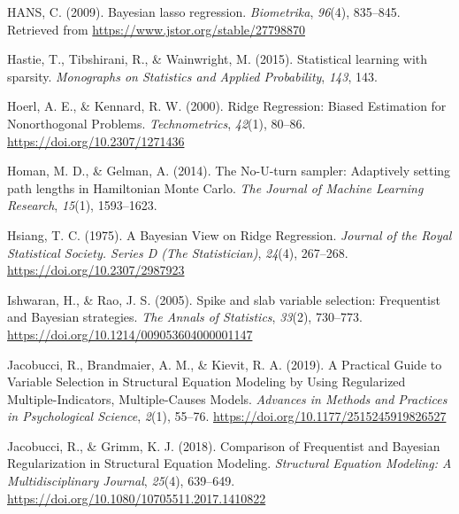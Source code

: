 \documentclass[
  man, donotrepeattitle,floatsintext]{apa6}
\newlength{\cslhangindent}
\newlength{\cslentryspacingunit} %
\newenvironment{CSLReferences}[2] %
 {%
  \setlength{\parindent}{0pt}
  \ifodd #1
  \let\oldpar\par
  \def\par{\hangindent=\cslhangindent\oldpar}
  \fi
  \setlength{\parskip}{#2\cslentryspacingunit}
 }%
 {}
\begin{document}
\begin{CSLReferences}{1}{0}
\leavevmode{}%
HANS, C. (2009). Bayesian lasso regression. \emph{Biometrika}, \emph{96}(4), 835--845. Retrieved from \url{https://www.jstor.org/stable/27798870}

\leavevmode{}%
Hastie, T., Tibshirani, R., \& Wainwright, M. (2015). Statistical learning with sparsity. \emph{Monographs on Statistics and Applied Probability}, \emph{143}, 143.

\leavevmode{}%
Hoerl, A. E., \& Kennard, R. W. (2000). Ridge {Regression}: {Biased} {Estimation} for {Nonorthogonal} {Problems}. \emph{Technometrics}, \emph{42}(1), 80--86. \url{https://doi.org/10.2307/1271436}

\leavevmode{}%
Homan, M. D., \& Gelman, A. (2014). The {No}-{U}-turn sampler: Adaptively setting path lengths in {Hamiltonian} {Monte} {Carlo}. \emph{The Journal of Machine Learning Research}, \emph{15}(1), 1593--1623.

\leavevmode{}%
Hsiang, T. C. (1975). A {Bayesian} {View} on {Ridge} {Regression}. \emph{Journal of the Royal Statistical Society. Series D (The Statistician)}, \emph{24}(4), 267--268. \url{https://doi.org/10.2307/2987923}

\leavevmode{}%
Ishwaran, H., \& Rao, J. S. (2005). Spike and slab variable selection: {Frequentist} and {Bayesian} strategies. \emph{The Annals of Statistics}, \emph{33}(2), 730--773. \url{https://doi.org/10.1214/009053604000001147}

\leavevmode{}%
Jacobucci, R., Brandmaier, A. M., \& Kievit, R. A. (2019). A {Practical} {Guide} to {Variable} {Selection} in {Structural} {Equation} {Modeling} by {Using} {Regularized} {Multiple}-{Indicators}, {Multiple}-{Causes} {Models}. \emph{Advances in Methods and Practices in Psychological Science}, \emph{2}(1), 55--76. \url{https://doi.org/10.1177/2515245919826527}

\leavevmode{}%
Jacobucci, R., \& Grimm, K. J. (2018). Comparison of {Frequentist} and {Bayesian} {Regularization} in {Structural} {Equation} {Modeling}. \emph{Structural Equation Modeling: A Multidisciplinary Journal}, \emph{25}(4), 639--649. \url{https://doi.org/10.1080/10705511.2017.1410822}


\end{CSLReferences}
\end{document}
